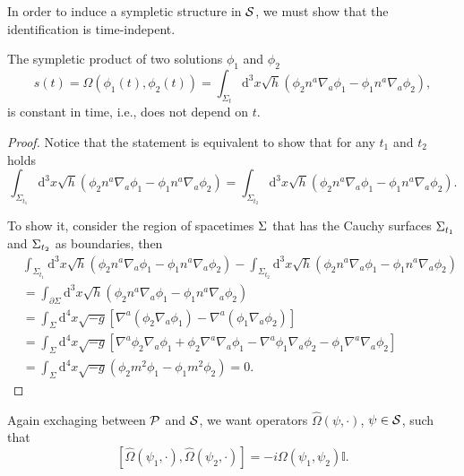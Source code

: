 In order to induce a sympletic structure in \({\mathcal{S}}\), we must show that the identification is time-indepent.
\begin{proposition}
    The sympletic product of two solutions \(\phi_1\) and \(\phi_2\)
    \begin{equation}
        s(t)=\Omega(\phi_1(t),\phi_2(t))=\int_{\Sigma_t}\mathrm{d}^3x\sqrt{h}\left(\phi_2n^a\nabla_a\phi_1-\phi_1n^a\nabla_a\phi_2\right),
    \end{equation}
    is constant in time, i.e., does not depend on \(t\).
\end{proposition}
\begin{proof}
    Notice that the statement is equivalent to show that for any \(t_1\) and \(t_2\) holds
    \begin{equation}
        \int_{\Sigma_{t_1}}\mathrm{d}^3x\sqrt{h}\left(\phi_2n^a\nabla_a\phi_1-\phi_1n^a\nabla_a\phi_2\right)=\int_{\Sigma_{t_2}}\mathrm{d}^3x\sqrt{h}\left(\phi_2n^a\nabla_a\phi_1-\phi_1n^a\nabla_a\phi_2\right).
    \end{equation}

    To show it, consider the region of spacetimes \(\Sigma\) that has the Cauchy surfaces \(\Sigma_{t_1}\) and \(\Sigma_{t_2}\) as boundaries, then
    \begin{subequations}
        \begin{align}
            &\int_{\Sigma_{t_1}}\mathrm{d}^3x\sqrt{h}\left(\phi_2n^a\nabla_a\phi_1-\phi_1n^a\nabla_a\phi_2\right)-\int_{\Sigma_{t_2}}\mathrm{d}^3x\sqrt{h}\left(\phi_2n^a\nabla_a\phi_1-\phi_1n^a\nabla_a\phi_2\right)\\
            &=\int_{\partial\Sigma}\mathrm{d}^3x\sqrt{h}\left(\phi_2n^a\nabla_a\phi_1-\phi_1n^a\nabla_a\phi_2\right)\\
            &=\int_{\Sigma}\mathrm{d}^4x\sqrt{-g}\left[\nabla^a\left(\phi_2\nabla_a\phi_1\right)-\nabla^a\left(\phi_1\nabla_a\phi_2\right)\right]\\
            &=\int_{\Sigma}\mathrm{d}^4x\sqrt{-g}\left[\nabla^a\phi_2\nabla_a\phi_1+\phi_2\nabla^a\nabla_a\phi_1-\nabla^a\phi_1\nabla_a\phi_2-\phi_1\nabla^a\nabla_a\phi_2\right]\\
            &=\int_{\Sigma}\mathrm{d}^4x\sqrt{-g}\left(\phi_2m^2\phi_1-\phi_1m^2\phi_2\right)=0.
        \end{align}
    \end{subequations}
\end{proof}

Again exchaging between \({\mathcal{P}}\) and \({\mathcal{S}}\), we want operators \(\hat{\Omega}(\psi,\cdot)\), \(\psi\in{\mathcal{S}}\), such that
\begin{equation}
    \left[\hat{\Omega}(\psi_1,\cdot),\hat{\Omega}(\psi_2,\cdot)\right]=-i\Omega(\psi_1,\psi_2)\mathbb{I}.
\end{equation}

